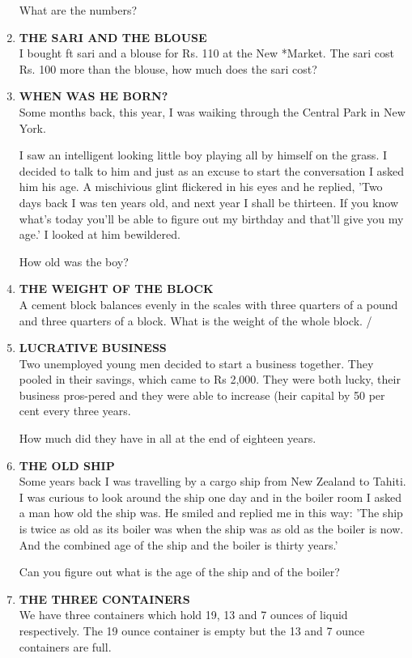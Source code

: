 \documentclass[12pt]{article}
\begin{document}
\begin{enumerate}
What  are the numbers? 
%
\item \textbf{THE  SARI  AND  THE  BLOUSE} \\
I bought  ft sari  and  a blouse  for Rs.  110 at the New *Market.  The  sari  cost  Rs.  100 more  than  the blouse, how much  does  the sari cost? 
%
\item \textbf{WHEN  WAS  HE BORN?} \\
Some  months  back,  this  year,  I was  waiking  through the Central  Park  in New  York. 

I saw  an intelligent  looking  little  boy  playing  all by himself  on the grass.  I decided  to talk  to him  and  just as an excuse  to start  the  conversation  I asked  him  his age. A mischivious  glint  flickered  in his eyes  and he replied,  'Two  days  back  I was  ten years  old, and next  year I shall  be thirteen.  If you know  what's  today  you'll  be able to figure  out  my  birthday  and  that'll  give  you my age.'  I looked  at him bewildered. 

How  old was the boy? 
%
\item \textbf{THE WEIGHT  OF THE  BLOCK}\\
A cement  block  balances  evenly  in the scales  with  three quarters  of a pound  and three  quarters  of a block.  
What is the weight  of the whole  block.  / 
%
\item \textbf{LUCRATIVE  BUSINESS} \\
Two unemployed  young  men  decided  to start  a business together.  They  pooled  in their  savings,  which  came  to Rs 2,000.  They  were  both  lucky,  their  business  pros-pered  and  they  were  able  to increase  (heir  capital  by 50 per cent  every  three  years. 

How  much  did they  have  in all at the end of eighteen years. 
%
\item \textbf{THE  OLD  SHIP} \\
Some  years  back  I was  travelling  by a cargo  ship  from New Zealand  to Tahiti.  I was curious  to look  around  the ship one day and in the boiler  room  I asked  a man  how old the ship  was.  He  smiled  and replied  me in this  way: 'The ship  is twice  as old as its boiler  was when  the ship was as old as the boiler  is now.  And  the  combined  age of the ship  and the boiler  is thirty  years.' 

Can you  figure  out what  is the age of the ship  and of the boiler? 
%
\item \textbf{THE  THREE  CONTAINERS} \\
We have  three  containers  which  hold  19, 13 and  7 ounces  of liquid  respectively.  The  19 ounce  container  is empty  but the 13 and 7 ounce  containers  are full.  


\end{enumerate}
\end{document}
